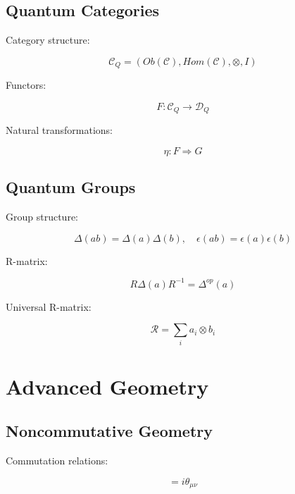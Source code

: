 \documentclass[12pt]{article}
\begin{document}
\subsection{Quantum Categories}

Category structure:

\begin{equation}
\mathcal{C}_Q = (Ob(\mathcal{C}), Hom(\mathcal{C}), \otimes, I)
\end{equation}

Functors:

\begin{equation}
F: \mathcal{C}_Q \rightarrow \mathcal{D}_Q
\end{equation}

Natural transformations:

\begin{equation}
\eta: F \Rightarrow G
\end{equation}

\subsection{Quantum Groups}

Group structure:

\begin{equation}
\Delta(ab) = \Delta(a)\Delta(b), \quad \epsilon(ab) = \epsilon(a)\epsilon(b)
\end{equation}

R-matrix:

\begin{equation}
R\Delta(a)R^{-1} = \Delta^{op}(a)
\end{equation}

Universal R-matrix:

\begin{equation}
\mathcal{R} = \sum_i a_i \otimes b_i
\end{equation}

\section{Advanced Geometry}

\subsection{Noncommutative Geometry}

Commutation relations:

\begin{equation}
[x_\mu, x_\nu] = i\theta_{\mu\nu}
\end{equation}
\end{document}
